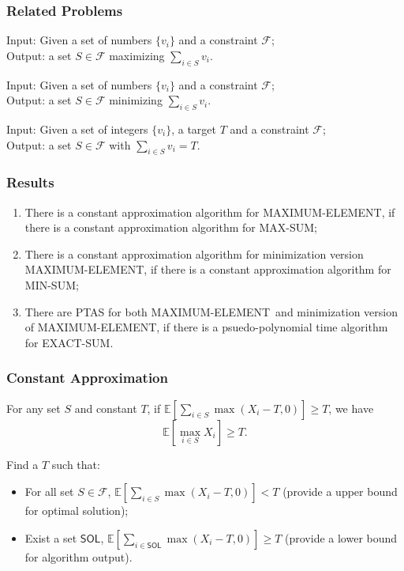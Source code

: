 \documentclass{beamer}
\newcommand{\calF}{{\mathcal F}}
\newcommand{\Exp}{{\mathbb{E}}}
\newcommand{\sol}{\mathsf{SOL}}
\newcommand{\MM}{{\textsf{MAXIMUM-ELEMENT}}}
\newcommand{\MS}{{\textsf{MAX-SUM}}}
\newcommand{\ms}{{\textsf{MIN-SUM}}}
\newcommand{\ES}{{\textsf{EXACT-SUM}}}
\begin{document}
\begin{frame}
    \frametitle{Related Problems}
    \begin{problem}
        Input: Given a set of numbers $\{v_i\}$ and a constraint $\calF$;\\
        Output: a set $S\in \calF$ maximizing $\sum_{i\in S} v_i$.
    \end{problem}
    \begin{problem}
        Input: Given a set of numbers $\{v_i\}$ and a constraint $\calF$;\\
        Output: a set $S\in\calF$ minimizing $\sum_{i\in S} v_i$.
    \end{problem}
    \begin{problem}
        Input: Given a set of integers $\{v_i\}$, a target $T$ and a constraint $\calF$;\\
        Output: a set $S\in \calF$ with $\sum_{i\in S} v_i = T$.
    \end{problem}
\end{frame}

\begin{frame}
\frametitle{Results}
\begin{theorem}
    \begin{enumerate}
        \item    There is a constant approximation algorithm for \MM, if there is a constant approximation algorithm for \MS;
        \item    There is a constant approximation algorithm for minimization version \MM, if there is a constant approximation algorithm for \ms;
        \item    There are PTAS for both \MM\ and minimization version of \MM, if there is a psuedo-polynomial time algorithm for \ES.
\end{enumerate}
\end{theorem}
\end{frame}

\begin{frame}
    \frametitle{Constant Approximation}

    \begin{lemma}
        For any set $S$ and constant $T$, if $\Exp[\sum_{i\in S} \max(X_i - T, 0)] \geq T$, we have
        $$\Exp[\max_{i\in S} X_i] \geq T.$$
    \end{lemma}

    Find a $T$ such that:
    \begin{itemize}
        \item For all set $S\in \calF$, $\Exp[\sum_{i\in S} \max(X_i - T, 0)] < T$ (provide a upper bound for optimal solution);
        \item Exist a set $\sol$, $\Exp[\sum_{i\in \sol} \max(X_i - T, 0)] \geq T$ (provide a lower bound for algorithm output).
    \end{itemize}
\end{frame}
\end{document}
